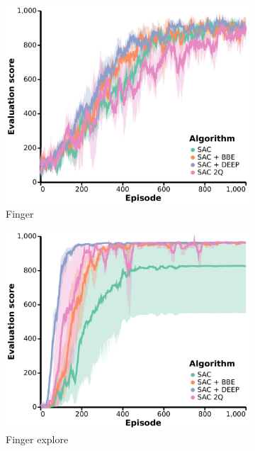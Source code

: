 \begin{figure}[h]
    \begin{subfigure}[b]{0.24\textwidth}
        \centering
        \includegraphics[width=\textwidth]{figures/deep/neurips_SAC2Q_finger.pdf}
        \caption{Finger}
    \end{subfigure}
    \begin{subfigure}[b]{0.24\textwidth}
        \centering
        \includegraphics[width=\textwidth]{figures/deep/neurips_SAC2Q_finger_explore.pdf}
        \caption{Finger explore}
    \end{subfigure}
    \hfill
    \begin{subfigure}[b]{0.24\textwidth}

\end{subfigure}
\end{figure}
